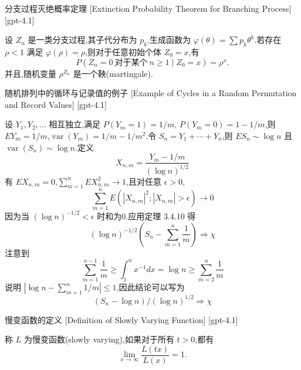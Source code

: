 \documentclass[UTF8]{ctexart}
\begin{document}
    
    
    \begin{thm}
        {分支过程灭绝概率定理}
        [Extinction Probability Theorem for Branching Process]
        [gpt-4.1]
        
设 $Z_{n}$ 是一类分支过程,其子代分布为 $p_{k}$,生成函数为 $\varphi(\theta) = \sum p_{k} \theta^{k}$.若存在 $\rho < 1$ 满足 $\varphi(\rho) = \rho$,则对于任意初始个体 $Z_0 = x$,有
\[
P(Z_{n} = 0~\text{对于某个}~ n \geq 1 \mid Z_{0} = x) = \rho^{x}.
\]
并且,随机变量 $\rho^{Z_{n}}$ 是一个鞅(martingale).

    \end{thm}
    
    
    
    \begin{xmp}
        {随机排列中的循环与记录值的例子}
        [Example of Cycles in a Random Permutation and Record Values]
        [gpt-4.1]
        
设 $Y_1, Y_2, \ldots$ 相互独立,满足 $P(Y_m = 1) = 1/m$, $P(Y_m = 0) = 1 - 1/m$,则 $E Y_m = 1/m$,$\operatorname{var}(Y_m) = 1/m - 1/m^2$.令 $S_n = Y_1 + \cdots + Y_n$,则 $E S_n \sim \log n$ 且 $\operatorname{var}(S_n) \sim \log n$.定义
\[
X_{n, m} = \frac{Y_m - 1/m}{(\log n)^{1/2}}
\]
有 $E X_{n, m} = 0$,$\sum_{m=1}^{n} E X_{n, m}^2 \to 1$,且对任意 $\epsilon > 0$,
\[
\sum_{m=1}^{n} E(|X_{n, m}|^2 ; |X_{n, m}| > \epsilon) \to 0
\]
因为当 $(\log n)^{-1/2} < \epsilon$ 时和为0.应用定理 3.4.10 得
\[
(\log n)^{-1/2} \left( S_n - \sum_{m=1}^{n} \frac{1}{m} \right) \Rightarrow \chi
\]
注意到
\[
\sum_{m=1}^{n-1} \frac{1}{m} \geq \int_{1}^{n} x^{-1} dx = \log n \geq \sum_{m=2}^{n} \frac{1}{m}
\]
说明 $|\log n - \sum_{m=1}^{n} 1/m| \leq 1$,因此结论可以写为
\[
(S_n - \log n) / (\log n)^{1/2} \Rightarrow \chi
\]

    \end{xmp}
    
    
    
    \begin{dfn}
        {慢变函数的定义}
        [Definition of Slowly Varying Function]
        [gpt-4.1]
        
称 $L$ 为慢变函数(slowly varying),如果对于所有 $t > 0$,都有
\[
\operatorname{lim}_{x \to \infty} \frac{L(t x)}{L(x)} = 1.
\]

    \end{dfn}
    
\end{document}
